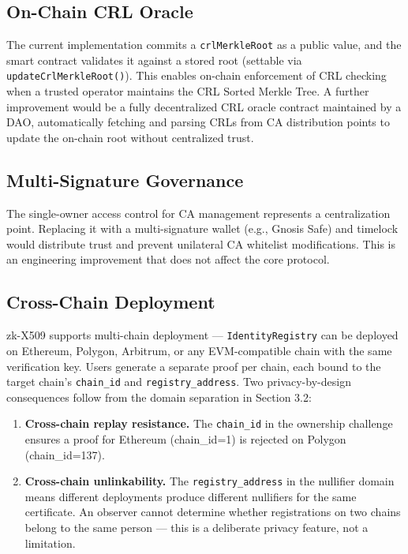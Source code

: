 \documentclass[11pt, a4paper]{article}
\begin{document}
\subsection{On-Chain CRL Oracle}\label{on-chain-crl-oracle}

The current implementation commits a \texttt{crlMerkleRoot} as a public
value, and the smart contract validates it against a stored root
(settable via \texttt{updateCrlMerkleRoot()}). This enables on-chain
enforcement of CRL checking when a trusted operator maintains the CRL
Sorted Merkle Tree. A further improvement would be a fully decentralized
CRL oracle contract maintained by a DAO, automatically fetching and
parsing CRLs from CA distribution points to update the on-chain root
without centralized trust.

\subsection{Multi-Signature
Governance}\label{multi-signature-governance}

The single-owner access control for CA management represents a
centralization point. Replacing it with a multi-signature wallet (e.g.,
Gnosis Safe) and timelock would distribute trust and prevent unilateral
CA whitelist modifications. This is an engineering improvement that does
not affect the core protocol.

\subsection{Cross-Chain Deployment}\label{cross-chain-deployment}

zk-X509 supports multi-chain deployment --- \texttt{IdentityRegistry}
can be deployed on Ethereum, Polygon, Arbitrum, or any EVM-compatible
chain with the same verification key. Users generate a separate proof
per chain, each bound to the target chain's \texttt{chain\_id} and
\texttt{registry\_address}. Two privacy-by-design consequences follow
from the domain separation in Section 3.2:

\begin{enumerate}
\def\labelenumi{\arabic{enumi}.}
\item
  \textbf{Cross-chain replay resistance.} The \texttt{chain\_id} in the
  ownership challenge ensures a proof for Ethereum (chain\_id=1) is
  rejected on Polygon (chain\_id=137).
\item
  \textbf{Cross-chain unlinkability.} The \texttt{registry\_address} in
  the nullifier domain means different deployments produce different
  nullifiers for the same certificate. An observer cannot determine
  whether registrations on two chains belong to the same person --- this
  is a deliberate privacy feature, not a limitation.
\end{enumerate}
\end{document}

